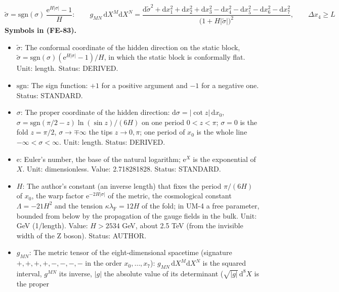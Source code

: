 \documentclass[
  10pt,
]{article}
\providecommand{\tightlist}{%
  \setlength{\itemsep}{0pt}\setlength{\parskip}{0pt}}
\begin{document}
\[
\tilde\sigma = \mathrm{sgn}(\sigma)\,\frac{\mathrm{e}^{H\lvert\sigma\rvert} - 1}{H}:\qquad
g_{MN}\,\mathrm{d}X^M\mathrm{d}X^N = \frac{\mathrm{d}\tilde\sigma^2 + \mathrm{d}x_1^2 + \mathrm{d}x_2^2 + \mathrm{d}x_3^2 - \mathrm{d}x_4^2
 - \mathrm{d}x_5^2 - \mathrm{d}x_6^2 - \mathrm{d}x_7^2}{\big(1 + H\lvert\tilde\sigma\rvert\big)^2},\qquad \Delta x_4 \ge L \tag{FE-83}
\] \textbf{Symbols in (FE-83).}

\begin{itemize}
\tightlist
\item
  \(\tilde\sigma\): The conformal coordinate of the hidden direction on
  the static block,
  \(\tilde\sigma = \mathrm{sgn}(\sigma)(\mathrm{e}^{H\lvert\sigma\rvert} - 1)/H\),
  in which the static block is conformally flat. Unit: length. Status:
  DERIVED.
\item
  \(\mathrm{sgn}\): The sign function: \(+1\) for a positive argument
  and \(-1\) for a negative one. Status: STANDARD.
\item
  \(\sigma\): The proper coordinate of the hidden direction:
  \(\mathrm{d}\sigma = \lvert\cot z\rvert\,\mathrm{d}x_0\),
  \(\sigma = \mathrm{sgn}(\pi/2 - z)\ln(\sin z)/(6H)\) on one period
  \(0 < z < \pi\); \(\sigma = 0\) is the fold \(z = \pi/2\),
  \(\sigma \to \mp\infty\) the tips \(z \to 0, \pi\); one period of
  \(x_0\) is the whole line \(-\infty < \sigma < \infty\). Unit: length.
  Status: DERIVED.
\item
  \(\mathrm{e}\): Euler's number, the base of the natural logarithm;
  \(\mathrm{e}^{X}\) is the exponential of \(X\). Unit: dimensionless.
  Value: 2.718281828. Status: STANDARD.
\item
  \(H\): The author's constant (an inverse length) that fixes the period
  \(\pi/(6H)\) of \(x_0\), the warp factor
  \(\mathrm{e}^{-2H\lvert\sigma\rvert}\) of the metric, the cosmological
  constant \(\Lambda = -21H^2\) and the tension
  \(\kappa\lambda_{\mathrm{F}} = 12H\) of the fold; in UM-4 a free
  parameter, bounded from below by the propagation of the gauge fields
  in the bulk. Unit: GeV (1/length). Value: \(H > 2534\) GeV, about 2.5
  TeV (from the invisible width of the Z boson). Status: AUTHOR.
\item
  \(g_{MN}\): The metric tensor of the eight-dimensional spacetime
  (signature \(+,+,+,+,-,-,-,-\) in the order \(x_0, \dots, x_7\)):
  \(g_{MN}\,\mathrm{d}X^M\mathrm{d}X^N\) is the squared interval,
  \(g^{MN}\) its inverse, \(\lvert g\rvert\) the absolute value of its
  determinant (\(\sqrt{\lvert g\rvert}\,\mathrm{d}^8X\) is the proper

\end{itemize}
\end{document}
